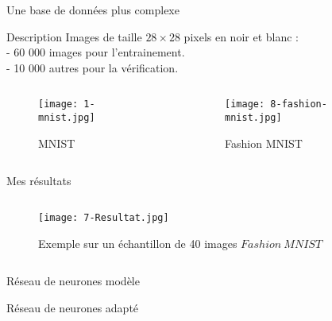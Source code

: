
\begin{frame}{Une base de données plus complexe}
    \begin{block}{Description}
        Images de taille $28 \times 28$ pixels en noir et blanc : \\
        \quad - 60 000 images pour l'entrainement. \\
        \quad - 10 000 autres pour la vérification.
    \end{block}
    \begin{columns}
        \begin{column}{0.5\textwidth}
            \begin{figure}
                \centering
                \texttt{[image: 1-mnist.jpg]}
                \caption{MNIST}
            \end{figure}
        \end{column}
        \begin{column}{0.5\textwidth}
            \begin{figure}
                \centering
                \texttt{[image: 8-fashion-mnist.jpg]}
                \caption{Fashion MNIST}
            \end{figure}
        \end{column}
    \end{columns}
\end{frame}


\begin{frame}{Mes résultats}
    \begin{columns}[T]
        \begin{column}{.75\textwidth}
            \begin{figure}
                \centering
                \texttt{[image: 7-Resultat.jpg]}
                \caption{Exemple sur un échantillon de 40 images $Fashion\ MNIST$}
            \end{figure}
        \end{column}
        \hfill
        \begin{column}{.25\textwidth}
            \bigskip	\bigskip	\bigskip
            
        \end{column}
    \end{columns}
\end{frame}



\begin{frame}{Réseau de neurones modèle}
    
\end{frame}

\begin{frame}{Réseau de neurones adapté}
    
\end{frame}